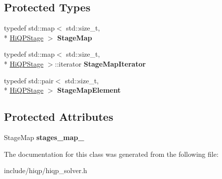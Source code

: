 \subsection*{Protected Types}
\begin{DoxyCompactItemize}
\item 
\hypertarget{classhiqp_1_1HiQPSolver_afc1077bf48c2ad65aae0140f0aa296f7}{typedef std\-::map$<$ std\-::size\-\_\-t, \\*
\hyperlink{structhiqp_1_1HiQPStage}{Hi\-Q\-P\-Stage} $>$ {\bfseries Stage\-Map}}\label{classhiqp_1_1HiQPSolver_afc1077bf48c2ad65aae0140f0aa296f7}

\item 
\hypertarget{classhiqp_1_1HiQPSolver_a2766a24ebd93fb0ebcc6a5e655b6dd03}{typedef std\-::map$<$ std\-::size\-\_\-t, \\*
\hyperlink{structhiqp_1_1HiQPStage}{Hi\-Q\-P\-Stage} $>$\-::iterator {\bfseries Stage\-Map\-Iterator}}\label{classhiqp_1_1HiQPSolver_a2766a24ebd93fb0ebcc6a5e655b6dd03}

\item 
\hypertarget{classhiqp_1_1HiQPSolver_aff93ec714f04fc68e3279376e66e1821}{typedef std\-::pair$<$ std\-::size\-\_\-t, \\*
\hyperlink{structhiqp_1_1HiQPStage}{Hi\-Q\-P\-Stage} $>$ {\bfseries Stage\-Map\-Element}}\label{classhiqp_1_1HiQPSolver_aff93ec714f04fc68e3279376e66e1821}

\end{DoxyCompactItemize}
\subsection*{Protected Attributes}
\begin{DoxyCompactItemize}
\item 
\hypertarget{classhiqp_1_1HiQPSolver_ace60cd0962fae7c46a88e68047f2cc29}{Stage\-Map {\bfseries stages\-\_\-map\-\_\-}}\label{classhiqp_1_1HiQPSolver_ace60cd0962fae7c46a88e68047f2cc29}

\end{DoxyCompactItemize}


The documentation for this class was generated from the following file\-:\begin{DoxyCompactItemize}
\item 
include/hiqp/hiqp\-\_\-solver.\-h\end{DoxyCompactItemize}
